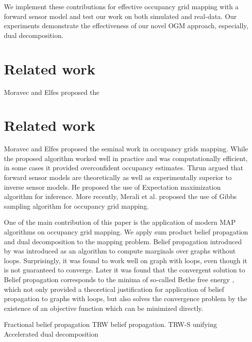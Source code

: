 \documentclass[letterpaper, 10 pt, conference]{ieeeconf} %
\begin{document}
We implement these contributions for effective occupancy grid mapping with a 
forward sensor model and test our work on both simulated and real-data. Our 
experiments demonstrate the effectiveness of our novel OGM approach, especially, 
dual decomposition.  


\section{Related work} 
\label{sec:related}

Moravec and Elfes \cite{elfes1989using,moravec1988sensor,moravec1985high} proposed the

\section{Related work}
Moravec and Elfes \cite{elfes1989using,moravec1988sensor,moravec1985high} 
proposed the
seminal work in occupancy grids mapping. While the proposed algorithm worked
well in practice and was computationally efficient, in some cases it provided
overconfident occupancy estimates. Thrun \cite{thrun2003learning} argued that
forward sensor models are theoretically as well as experimentally superior to 
inverse sensor models. He proposed the use of Expectation maximization
algorithm for inference. More recently, Merali et al. \cite{merali2013icra}
proposed the use of Gibbs sampling algorithm for occupancy grid mapping.

One of the main contribution of this paper is the application of modern MAP
algorithms on occupancy grid mapping. We apply sum product belief propagation 
\cite{kschischang2001factor} and dual decomposition
\cite{sontag2011introduction} to the mapping problem. Belief propagation
introduced by \cite{pearl1986fusion} was introduced as an algorithm to compute
marginals over graphs without loops.  Surprisingly, it was found to work well
on graph with loops, even though it is not guaranteed to converge. Later it
was found that the convergent solution to Belief propagation corresponds to
the minima of so-called Bethe free energy \cite{yedidia2000generalized}, which
not only provided a theoretical justification for application of belief
propagation to graphs with loops, but also solves the convergence problem by 
the existence of an objective function which can be minimized directly.

\cite{wiegerinck2003fractional} Fractional belief propagation
\cite{wainwright2005map} TRW belief propagation.
\cite{kolmogorov2006convergent} TRW-S
\cite{meltzer2009convergent} unifying
\cite{jojic2010accelerated} Accelerated dual decomposition
\end{document}
